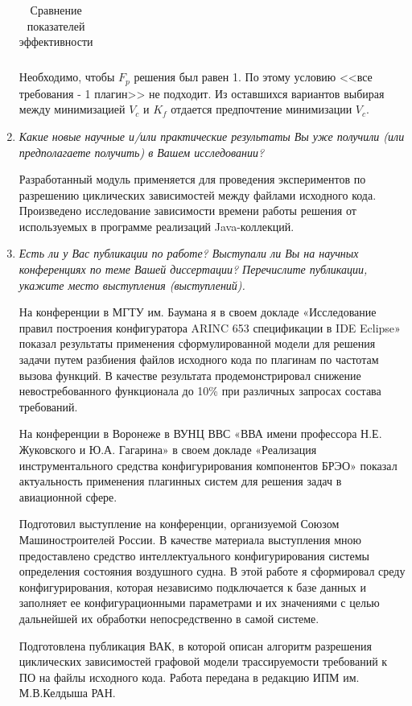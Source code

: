 \documentclass{article}
\begin{document}
\begin{enumerate}
\begin{table}[H]
\begin{tabularx}{\textwidth}{ |>{\center\arraybackslash}X|>{\center\arraybackslash}X|>{\center\arraybackslash}X|>{\center\arraybackslash}X| }
        \end{tabularx}
        \caption{Сравнение показателей эффективности}
        \label{tab:difference}
        \end{table}

        Необходимо, чтобы $F_{p}$ решения был равен 1. По этому условию <<все требования - 1 плагин>> не подходит. Из оставшихся вариантов выбирая между минимизацией $V_{c}$ и $K_{f}$ отдается предпочтение минимизации $V_{c}$.

        \item \textit{Какие новые научные и/или практические результаты Вы уже получили (или предполагаете получить) в Вашем исследовании?}

        Разработанный модуль применяется для проведения экспериментов по разрешению циклических зависимостей между файлами исходного кода. Произведено исследование зависимости времени работы решения от используемых в программе реализаций Java-коллекций.

        \item \textit{Есть ли у Вас публикации по работе? Выступали ли Вы на научных конференциях по теме Вашей диссертации? Перечислите публикации, укажите место выступления (выступлений).}

        На конференции в МГТУ им. Баумана я в своем докладе «Исследование правил построения конфигуратора ARINC 653 спецификации в IDE Eclipse» показал результаты применения сформулированной модели для решения задачи путем разбиения файлов исходного кода по плагинам по частотам вызова функций. В качестве результата продемонстрировал снижение невостребованного функционала до 10\% при различных запросах состава требований.

        На конференции в Воронеже в ВУНЦ ВВС «ВВА имени профессора Н.Е. Жуковского и Ю.А. Гагарина» в своем докладе «Реализация инструментального средства конфигурирования компонентов БРЭО» показал актуальность применения плагинных систем для решения задач в авиационной сфере.

        Подготовил выступление на конференции, организуемой Союзом Машиностроителей России. В качестве материала выступления мною предоставлено средство интеллектуального конфигурирования системы определения состояния воздушного судна. В этой работе я сформировал среду конфигурирования, которая независимо подключается к базе данных и заполняет ее конфигурационными параметрами и их значениями с целью дальнейшей их обработки непосредственно в самой системе.

        Подготовлена публикация ВАК, в которой описан алгоритм разрешения циклических зависимостей графовой модели трассируемости требований к ПО на файлы исходного кода. Работа передана в редакцию ИПМ им. М.В.Келдыша РАН.

    \end{enumerate}
\end{document}
